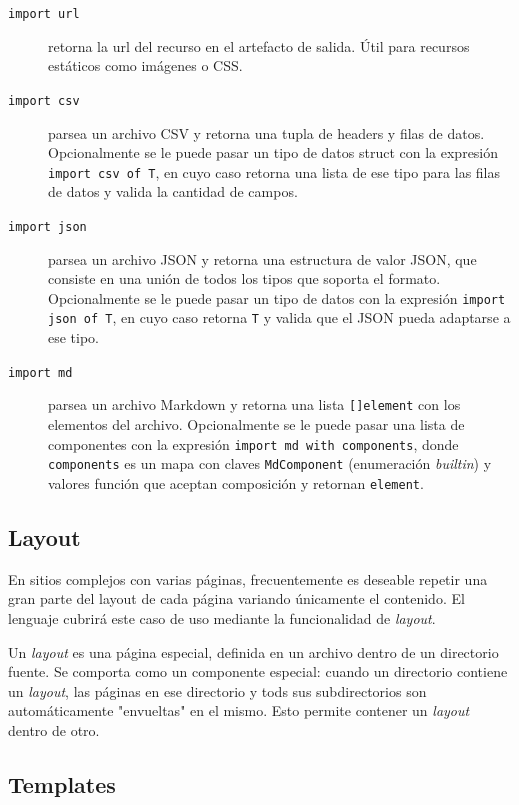 \begin{description}
	\item[\texttt{import url}] retorna la url del recurso en el artefacto de
	  salida. Útil para recursos estáticos como imágenes o CSS.
	\item[\texttt{import csv}] parsea un archivo CSV y retorna una tupla de headers
	  y filas de datos. Opcionalmente se le puede pasar un tipo de datos struct con
		la expresión \texttt{import csv of T}, en cuyo caso retorna una lista de ese
		tipo para las filas de datos y valida la cantidad de campos.
	\item[\texttt{import json}] parsea un archivo JSON y retorna una estructura de
	  valor JSON, que consiste en una unión de todos los tipos que soporta el
		formato. Opcionalmente se le puede pasar un tipo de datos con la expresión
		\texttt{import json of T}, en cuyo caso retorna \texttt{T} y valida que el
		JSON pueda adaptarse a ese tipo.
	\item[\texttt{import md}] parsea un archivo Markdown y retorna una lista
	  \texttt{[]element} con los elementos del archivo. Opcionalmente se le puede
		pasar una lista de componentes con la expresión \texttt{import md with
		components}, donde \texttt{components} es un mapa con claves
		\texttt{MdComponent} (enumeración \textit{builtin}) y valores función que
	  aceptan composición y retornan \texttt{element}.
\end{description}

\subsection{Layout}

En sitios complejos con varias páginas, frecuentemente es deseable repetir una
gran parte del layout de cada página variando únicamente el contenido. El
lenguaje cubrirá este caso de uso mediante la funcionalidad de \textit{layout}.

Un \textit{layout} es una página especial, definida en un archivo dentro de un
directorio fuente. Se comporta como un componente especial: cuando un directorio
contiene un \textit{layout}, las páginas en ese directorio y tods sus
subdirectorios son automáticamente "envueltas" en el mismo. Esto permite
contener un \textit{layout} dentro de otro.

\subsection{Templates}

